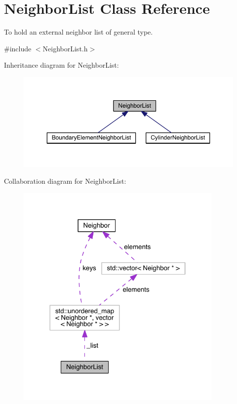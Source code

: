 \hypertarget{classNeighborList}{\section{Neighbor\+List Class Reference}
\label{classNeighborList}
}


To hold an external neighbor list of general type.  




{\ttfamily \#include $<$Neighbor\+List.\+h$>$}



Inheritance diagram for Neighbor\+List\+:\nopagebreak
\begin{figure}[H]
\begin{center}
\leavevmode
\includegraphics[width=350pt]{classNeighborList__inherit__graph}
\end{center}
\end{figure}


Collaboration diagram for Neighbor\+List\+:\nopagebreak
\begin{figure}[H]
\begin{center}
\leavevmode
\includegraphics[width=285pt]{classNeighborList__coll__graph}
\end{center}
\end{figure}
